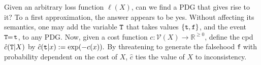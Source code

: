 \documentclass[twoside]{article}
\makeatletter
\theoremstyle{plain}
\theoremstyle{definition}
\newcommand{\V}{\mathcal V}
\newcommand\aar{\@ifstar\aar@one@star\aar@plain}
\newcommand\aar@one@star{\@ifstar\aar@resize{\aar@plain*}}
\newcommand\aar@resize[1]{\sbox{\aar@content}{#1}\scaleleftright[3.8ex]
		{\Biggl\langle\!\!\!\!\Biggl\langle}{\usebox{\aar@content}}
		{\Biggr\rangle\!\!\!\!\Biggr\rangle}}
\makeatother
\begin{document}
Given an arbitrary loss function $\ell(X)$, can we find a PDG that gives rise to it?
To a first approximation, the answer appears to be yes.
%
%
%
%
Without affecting its semantics, one may add the variable ${\tt T}$ that takes values $\{{\tt t}, {\tt f}\}$, and the event ${\tt T} \!\!=\! {\tt t}$, to any PDG.
%
Now, given a
cost function $c: \V(X) \to \mathbb R^{\ge 0}$,
define the cpd $\hat c({\tt T} |X)$ by
$
	\hat c({\tt t} | x) := \exp( - c(x)).
$
By threatening to generate the falsehood {\tt f} with probability dependent on the cost of $X$, $\hat c$ ties the value of $X$ to inconsistency.
%
\end{document}
